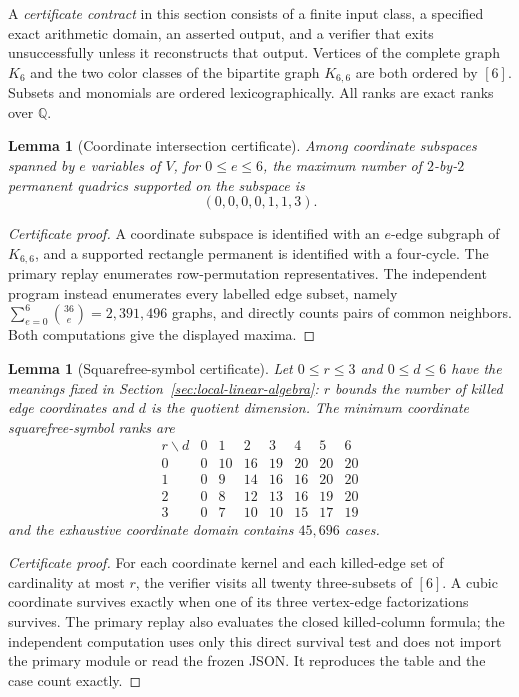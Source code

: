 \documentclass[11pt]{amsart}
\newcommand{\Q}{\mathbb{Q}}
\newtheorem{lemma}[theorem]{Lemma}
\theoremstyle{definition}
\begin{document}
A \emph{certificate contract} in this section consists of a finite input
class, a specified exact arithmetic domain, an asserted output, and a verifier
that exits unsuccessfully unless it reconstructs that output. Vertices of the
complete graph \(K_6\) and the two color classes of the bipartite graph
\(K_{6,6}\) are both ordered by \([6]\). Subsets and monomials are ordered
lexicographically. All ranks are exact ranks over \(\Q\).

\begin{lemma}[Coordinate intersection certificate]
\label{lem:certificate-intersection}
Among coordinate subspaces spanned by \(e\) variables of \(V\), for
\(0\le e\le6\), the maximum number of \(2\)-by-\(2\) permanent quadrics
supported on the subspace is
\[
 (0,0,0,0,1,1,3).
\]
\end{lemma}

\begin{proof}[Certificate proof]
A coordinate subspace is identified with an \(e\)-edge subgraph of
\(K_{6,6}\), and a supported rectangle permanent is identified with a
four-cycle. The primary replay enumerates row-permutation representatives.
The independent program 
instead enumerates every labelled edge subset, namely
\(\sum_{e=0}^6\binom{36}{e}=2{,}391{,}496\) graphs, and directly counts pairs
of common neighbors. Both computations give the displayed maxima.
\end{proof}

\begin{lemma}[Squarefree-symbol certificate]
\label{lem:certificate-squarefree}
Let \(0\le r\le3\) and \(0\le d\le6\) have the meanings fixed in
Section~\ref{sec:local-linear-algebra}: \(r\) bounds the number of killed edge
coordinates and \(d\) is the quotient dimension. The minimum coordinate
squarefree-symbol ranks are
\[
\begin{array}{c|rrrrrrr}
r\backslash d&0&1&2&3&4&5&6\\ \hline
0&0&10&16&19&20&20&20\\
1&0&9&14&16&16&20&20\\
2&0&8&12&13&16&19&20\\
3&0&7&10&10&15&17&19
\end{array}
\]
and the exhaustive coordinate domain contains \(45{,}696\) cases.
\end{lemma}

\begin{proof}[Certificate proof]
For each coordinate kernel and each killed-edge set of cardinality at most
\(r\), the verifier visits all twenty three-subsets of \([6]\). A cubic
coordinate survives exactly when one of its three vertex-edge factorizations
survives. The primary replay also evaluates the closed killed-column formula;
the independent computation uses only this direct survival test and does not import
the primary module or read the frozen JSON. It reproduces the table and the
case count exactly.
\end{proof}
\end{document}

